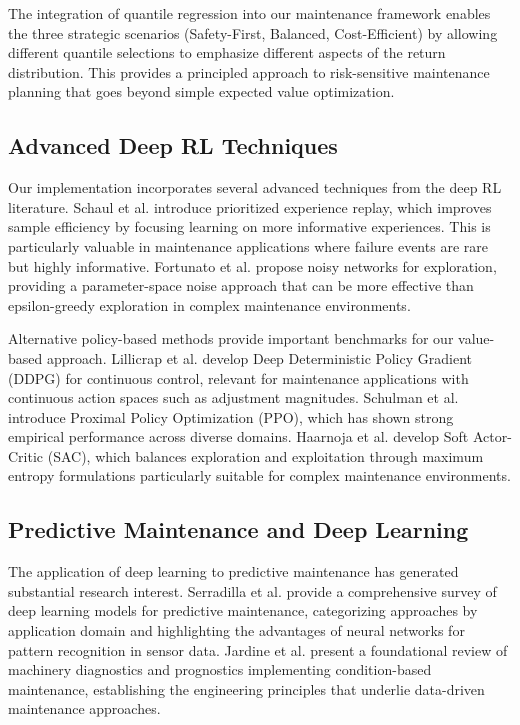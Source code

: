 \documentclass[twocolumn]{article}
\begin{document}
The integration of quantile regression into our maintenance framework enables the three strategic scenarios (Safety-First, Balanced, Cost-Efficient) by allowing different quantile selections to emphasize different aspects of the return distribution. This provides a principled approach to risk-sensitive maintenance planning that goes beyond simple expected value optimization.

\subsection{Advanced Deep RL Techniques}

Our implementation incorporates several advanced techniques from the deep RL literature. Schaul et al.\cite{schaul2016prioritized} introduce prioritized experience replay, which improves sample efficiency by focusing learning on more informative experiences. This is particularly valuable in maintenance applications where failure events are rare but highly informative. Fortunato et al.\cite{fortunato2017noisy} propose noisy networks for exploration, providing a parameter-space noise approach that can be more effective than epsilon-greedy exploration in complex maintenance environments.

Alternative policy-based methods provide important benchmarks for our value-based approach. Lillicrap et al.\cite{lillicrap2015continuous} develop Deep Deterministic Policy Gradient (DDPG) for continuous control, relevant for maintenance applications with continuous action spaces such as adjustment magnitudes. Schulman et al.\cite{schulman2017ppo} introduce Proximal Policy Optimization (PPO), which has shown strong empirical performance across diverse domains. Haarnoja et al.\cite{haarnoja2018sac} develop Soft Actor-Critic (SAC), which balances exploration and exploitation through maximum entropy formulations particularly suitable for complex maintenance environments.

\subsection{Predictive Maintenance and Deep Learning}

The application of deep learning to predictive maintenance has generated substantial research interest. Serradilla et al.\cite{serradilla2020deep} provide a comprehensive survey of deep learning models for predictive maintenance, categorizing approaches by application domain and highlighting the advantages of neural networks for pattern recognition in sensor data. Jardine et al.\cite{jardine2006review} present a foundational review of machinery diagnostics and prognostics implementing condition-based maintenance, establishing the engineering principles that underlie data-driven maintenance approaches.
\end{document}
